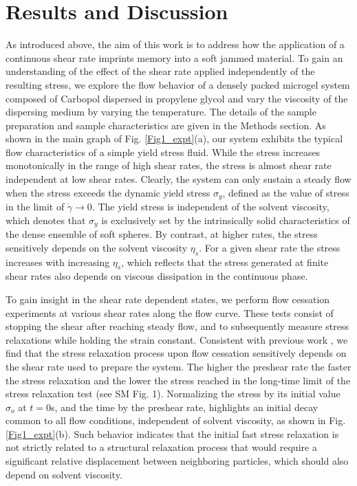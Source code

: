 \documentclass[%
preprint,
 amsmath,amssymb,
 aps,
]{revtex4-1}
\begin{document}
\section{Results and Discussion}

As introduced above, the aim of this work is to address how the application of a continuous shear rate imprints memory into a soft jammed material. To gain an understanding of the effect of the shear rate applied independently of the resulting stress, we explore the flow behavior of a densely packed microgel system composed of Carbopol dispersed in propylene glycol and vary the viscosity of the dispersing medium by varying the temperature. The details of the sample preparation and sample characteristics are given in the Methods section. 
As shown in the main graph of Fig. \ref{Fig1_expt}(a), our system exhibits the typical flow characteristics of a simple yield stress fluid. While the stress increases monotonically in the range of high shear rates, the stress is almost shear rate independent at low shear rates. Clearly, the system can only sustain a steady flow when the stress exceeds the dynamic yield stress $\sigma_y$, defined as the value of stress in the limit of $\dot{\gamma} \rightarrow 0$. The yield stress is independent of the solvent viscosity, which denotes that $\sigma_y$ is exclusively set by the intrinsically solid characteristics of the dense ensemble of soft spheres. By contrast, at higher rates, the stress sensitively depends on the solvent viscosity $\eta_s$. For a given shear rate the stress increases with increasing $\eta_s$, which reflects that the stress generated at finite shear rates also depends on viscous dissipation in the continuous phase.

To gain insight in the shear rate dependent states, we perform flow cessation experiments at various shear rates along the flow curve. These tests consist of stopping the shear after reaching steady flow, and to subsequently measure stress relaxations while holding the strain constant. Consistent with previous work \cite{mohan2015build,ballauff2013residual,vasisht2022residual}, we find that the stress relaxation process upon flow cessation sensitively depends on the shear rate used to prepare the system. The higher the preshear rate the faster the stress relaxation and the lower the stress reached in the long-time limit of the stress relaxation test (see SM Fig. 1). 
Normalizing the stress by its initial value $\sigma_o$ at $t=0$s, and the time by the preshear rate, highlights an initial decay common to all flow conditions, independent of solvent viscosity, as shown in Fig. \ref{Fig1_expt}(b).  
Such behavior indicates that the initial fast stress relaxation is not strictly related to a structural relaxation process that would require a significant relative displacement between neighboring particles, which should also depend on solvent viscosity. %
\end{document}
